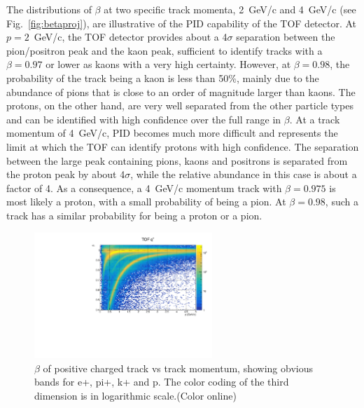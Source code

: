 The distributions of $\beta$ at two specific track momenta, 2~GeV/c and 4~GeV/c (see Fig.~\ref{fig:betaproj}), are illustrative of the PID capability of the TOF detector. At $p=2$~GeV/c, the TOF detector provides about a 4$\sigma$ separation between
the pion/positron peak and the kaon peak, sufficient to identify tracks with a $\beta=0.97$ or lower as kaons with a very
high certainty. However, at  $\beta=0.98$, the probability of the track being a kaon is less than 50\%, mainly due to the abundance of pions that is close to an order of magnitude larger than kaons. The protons, on the other hand, are very well
separated from the other particle types and can be identified with high confidence over the full range in $\beta$.
At a track momentum of 4~GeV/c, PID becomes much more difficult and represents the limit at which the TOF can identify protons with high confidence. The separation between the large peak containing pions, kaons and positrons is separated from the proton
peak by about 4$\sigma$, while the relative abundance in this case is about a factor of 4. As a consequence, a 4~GeV/c momentum
track with $\beta=0.975$ is most likely a proton, with a small probability of being a pion. At $\beta=0.98$, such
a track has a similar probability for being a proton or a pion.
\begin{figure}[tbp]
\begin{center}
\includegraphics[width=0.6\textwidth]{figures/beta_vs_p_positivetracks.pdf}
\caption{\label{fig:betavsp}$\beta$ of positive charged track vs track momentum, showing obvious bands for e+, pi+, k+ and p. The color coding of the third dimension
is in logarithmic scale.(Color online)}
\end{center}
\end{figure}

